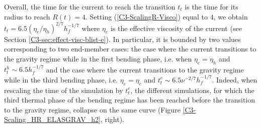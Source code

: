 Overall, the time for the current to reach the transition $t_t$ is the
time    for     its    radius    to    reach     $R(t)=4$.     Setting
(\ref{C3-ScalingR-Visco})     equal     to      $4$,     we     obtain
$t_t=6.5(\eta_e/\eta_h)^{2/7}h_f^{-1/7}$   where   $\eta_e$   is   the
effective     viscosity     of     the    current     (see     Section
\ref{C3-sec:effect-visc-blist-e}).   In particular,  it is  bounded by
two values corresponding  to two end-member cases: the  case where the
current transitions to  the gravity regime while in  the first bending
phase, i.e.  when $\eta_e= \eta_h$  and $t_t^h \sim 6.5h_f^{-1/7}$ and
the case where the current transitions  to the gravity regime while in
the    third   bending    phase,    i.e.     $\eta_e=   \eta_c$    and
$t_t^c \sim 6.5\nu^{-2/7}h_f^{-1/7}$.  Indeed, when rescaling the time
of the simulation by $t_t^c$, the different simulations, for which the
third thermal phase of the bending  regime has been reached before the
transition to the  gravity regime, collapse on the  same curve (Figure
\ref{C3-Scaling_HR_ELASGRAV_h2}, right).

